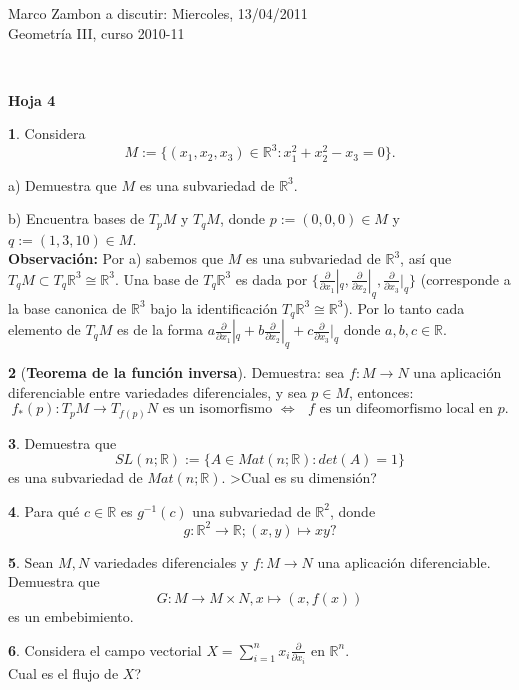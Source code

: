 \documentclass[12pt,a4paper]{report}
\theoremstyle{definition}
\newtheorem{ex}{}
\newcommand{\pd}[1]{\frac{\partial}{\partial #1}} %
\newcommand{\RR}{\ensuremath{\mathbb R}}
\begin{document}
\noindent
{\sffamily\large Marco Zambon 
\hfill   a discutir:   Miercoles, 13/04/2011\\Geometr\'ia III, curso 2010-11}
 

\noindent
\hrulefill{}\\
\begin{center}\bfseries\large\textsf{Hoja 4    \vspace{-2mm}}
\end{center}

\noindent
 
 

\begin{ex}
Considera $$M:=\{(x_1,x_2,x_3)\in \RR^3: x_1^2+x_2^2-x_3=0\}.$$

a) Demuestra que $M$ es una subvariedad de $\RR^3$.

b) Encuentra bases de $T_pM$ y $T_qM$,
donde $p:=(0,0,0)\in M$ y $q:=(1,3,10)\in M$.\\
\textbf{Observaci\'on:} Por a) sabemos que $M$  es una subvariedad de  $\RR^3$, as\'i que  $T_qM\subset T_q\RR^3\cong \RR^3$. Una base de $T_q\RR^3$ es dada por $\{\pd{x_1}|_q,\pd{x_2}|_q,\pd{x_3}|_q\}$ (corresponde a la base  canonica de  $\RR^3$ bajo la identificaci\'on $T_q\RR^3\cong \RR^3$). Por lo tanto 
 cada elemento de $T_qM$ es de la forma $a\pd{x_1}|_q+b\pd{x_2}|_q+c\pd{x_3}|_q$ donde $a,b,c\in \RR$. 
\end{ex}


 
\begin{ex} [\textbf{Teorema de la funci\'on inversa}] Demuestra:
sea $f \colon M \to N$ una aplicaci\'on diferenciable entre variedades diferenciales, y sea $p\in M$, entonces:
$$\text{$f_*(p) \colon T_pM \to T_{f(p)}N$ es un isomorfismo $\Leftrightarrow$ $f$ es un difeomorfismo local en $p$}.$$
\end{ex} 






\begin{ex} 
Demuestra que
$$SL(n;\RR) := \{A \in Mat(n;\RR) : det(A) = 1\}$$
es una subvariedad de $Mat(n;\RR)$. >Cual es su dimensi\'on? 
\end{ex} 


\begin{ex} Para qu\'e
 $ c\in \RR$ es $g^{-1}(c)$ una subvariedad de $\RR^2$, donde $$g : \RR^2 \to \RR; (x, y) \mapsto xy?$$  
\end{ex} 

\begin{ex} Sean $M,N$  variedades diferenciales y $f \colon M \to N$ una aplicaci\'on
diferenciable. Demuestra que $$G\colon M \to M \times N, x\mapsto (x,f(x))$$
es un embebimiento.  
\end{ex} 

\begin{ex} 
Considera el campo vectorial $X=\sum_{i=1}^n x_i \frac{\partial}{\partial x_i}$ en $\RR^n$.\\
Cual es el flujo de $X$?  
\end{ex} 


 
\end{document}
